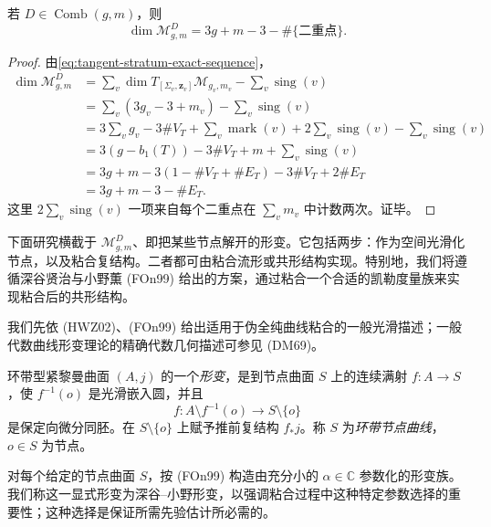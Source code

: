\begin{proposition}\label{prop:dimension-stable-curve-stratum}
若 $D\in\operatorname{Comb}(g,m)$，则
\begin{equation}
 \dim\mathcal M_{g,m}^D=3g+m-3-\#\{\text{二重点}\}.
 \label{eq:dimension-stable-curve-stratum}
\end{equation}
\end{proposition}
\begin{proof}
由\eqref{eq:tangent-stratum-exact-sequence}，
\[
 \begin{split}
 \dim\mathcal M_{g,m}^D
 &=\sum_v\dim T_{[\Sigma_v,\boldsymbol z_v]}\mathcal M_{g_v,m_v}
   -\sum_v\operatorname{sing}(v)\\
 &=\sum_v(3g_v-3+m_v)-\sum_v\operatorname{sing}(v)\\
 &=3\sum_vg_v-3\#V_T+\sum_v\operatorname{mark}(v)
   +2\sum_v\operatorname{sing}(v)-\sum_v\operatorname{sing}(v)\\
 &=3(g-b_1(T))-3\#V_T+m+\sum_v\operatorname{sing}(v)\\
 &=3g+m-3(1-\#V_T+\#E_T)-3\#V_T+2\#E_T\\
 &=3g+m-3-\#E_T.
 \end{split}
\]
这里 $2\sum_v\operatorname{sing}(v)$ 一项来自每个二重点在
$\sum_vm_v$ 中计数两次。证毕。
\end{proof}

下面研究横截于 $\mathcal M_{g,m}^D$、即把某些节点解开的形变。它包括两步：作为空间光滑化节点，以及粘合复结构。二者都可由粘合流形或共形结构实现。特别地，我们将遵循深谷贤治与小野薫 (FOn99) 给出的方案，通过粘合一个合适的凯勒度量族来实现粘合后的共形结构。

我们先依 (HWZ02)、(FOn99) 给出适用于伪全纯曲线粘合的一般光滑描述；一般代数曲线形变理论的精确代数几何描述可参见 (DM69)。

\begin{definition}[{(HWZ02)，定义 4.1}]\label{def:deformation-annular-nodal-curve}
环带型紧黎曼曲面 $(A,j)$ 的一个\emph{形变}，是到节点曲面 $S$ 上的连续满射
$f:A\to S$，使 $f^{-1}(o)$ 是光滑嵌入圆，并且
\[
 f:A\setminus f^{-1}(o)\longrightarrow S\setminus\{o\}
\]
是保定向微分同胚。在 $S\setminus\{o\}$ 上赋予推前复结构 $f_*j$。称 $S$ 为\emph{环带节点曲线}，$o\in S$ 为节点。
\end{definition}

对每个给定的节点曲面 $S$，按 (FOn99) 构造由充分小的
$\alpha\in\mathbb C$ 参数化的形变族。我们称这一显式形变为深谷--小野形变，以强调粘合过程中这种特定参数选择的重要性；这种选择是保证所需先验估计所必需的。

